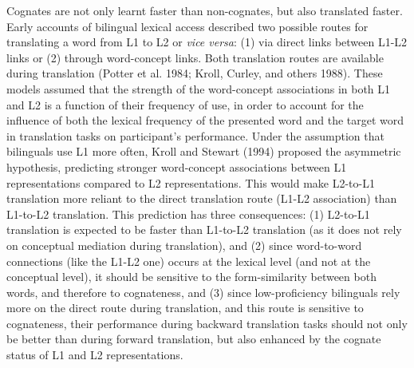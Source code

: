 \documentclass[
  man]{apa6}
\begin{document}
Cognates are not only learnt faster than non-cognates, but also
translated faster. Early accounts of bilingual lexical access described
two possible routes for translating a word from L1 to L2 or \emph{vice
versa}: (1) via direct links between L1-L2 links or (2) through
word-concept links. Both translation routes are available during
translation (Potter et al. 1984; Kroll, Curley, and others 1988). These
models assumed that the strength of the word-concept associations in
both L1 and L2 is a function of their frequency of use, in order to
account for the influence of both the lexical frequency of the presented
word and the target word in translation tasks on participant's
performance. Under the assumption that bilinguals use L1 more often,
Kroll and Stewart (1994) proposed the asymmetric hypothesis, predicting
stronger word-concept associations between L1 representations compared
to L2 representations. This would make L2-to-L1 translation more reliant
to the direct translation route (L1-L2 association) than L1-to-L2
translation. This prediction has three consequences: (1) L2-to-L1
translation is expected to be faster than L1-to-L2 translation (as it
does not rely on conceptual mediation during translation), and (2) since
word-to-word connections (like the L1-L2 one) occurs at the lexical
level (and not at the conceptual level), it should be sensitive to the
form-similarity between both words, and therefore to cognateness, and
(3) since low-proficiency bilinguals rely more on the direct route
during translation, and this route is sensitive to cognateness, their
performance during backward translation tasks should not only be better
than during forward translation, but also enhanced by the cognate status
of L1 and L2 representations.
\end{document}
